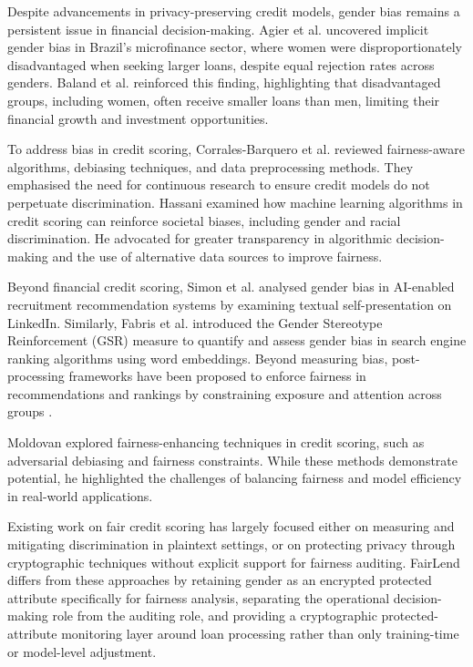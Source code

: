 \documentclass[a4paper,fleqn]{cas-dc}
\begin{document}
Despite advancements in privacy-preserving credit models, gender bias remains a persistent issue in financial decision-making. Agier et al. \cite{agier2013microfinance} uncovered implicit gender bias in Brazil’s microfinance sector, where women were disproportionately disadvantaged when seeking larger loans, despite equal rejection rates across genders. Baland et al. \cite{baland2019socially} reinforced this finding, highlighting that disadvantaged groups, including women, often receive smaller loans than men, limiting their financial growth and investment opportunities.

To address bias in credit scoring, Corrales-Barquero et al. \cite{corrales2021review} reviewed fairness-aware algorithms, debiasing techniques, and data preprocessing methods. They emphasised the need for continuous research to ensure credit models do not perpetuate discrimination. Hassani \cite{hassani2021societal} examined how machine learning algorithms in credit scoring can reinforce societal biases, including gender and racial discrimination. He advocated for greater transparency in algorithmic decision-making and the use of alternative data sources to improve fairness.

Beyond financial credit scoring, Simon et al. \cite{simon2023utilizing} analysed gender bias in AI-enabled recruitment recommendation systems by examining textual self-presentation on LinkedIn. Similarly, Fabris et al. \cite{fabris2020gender} introduced the Gender Stereotype Reinforcement (GSR) measure to quantify and assess gender bias in search engine ranking algorithms using word embeddings. Beyond measuring bias, post-processing frameworks have been proposed to enforce fairness in recommendations and rankings by constraining exposure and attention across groups \cite{biega2018equity, lopes2024recommendations}.

Moldovan \cite{moldovan2023algorithmic} explored fairness-enhancing techniques in credit scoring, such as adversarial debiasing and fairness constraints. While these methods demonstrate potential, he highlighted the challenges of balancing fairness and model efficiency in real-world applications.

Existing work on fair credit scoring has largely focused either on measuring and mitigating discrimination in plaintext settings, or on protecting privacy through cryptographic techniques without explicit support for fairness auditing. FairLend differs from these approaches by retaining gender as an encrypted protected attribute specifically for fairness analysis, separating the operational decision-making role from the auditing role, and providing a cryptographic protected-attribute monitoring layer around loan processing rather than only training-time or model-level adjustment.
\end{document}
